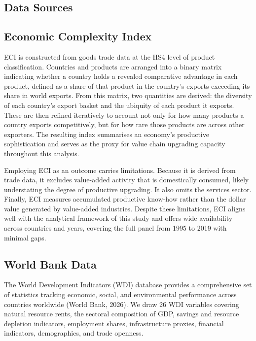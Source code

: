 \documentclass[12pt,a4paper]{report}
\begin{document}
\begin{appendices}

\chapter{Data Sources}

\section{Economic Complexity Index}

ECI is constructed from goods trade data at the HS4 level of product classification. Countries and products are arranged into a binary matrix indicating whether a country holds a revealed comparative advantage in each product, defined as a share of that product in the country's exports exceeding its share in world exports. From this matrix, two quantities are derived: the diversity of each country's export basket and the ubiquity of each product it exports. These are then refined iteratively to account not only for how many products a country exports competitively, but for how rare those products are across other exporters. The resulting index summarises an economy's productive sophistication and serves as the proxy for value chain upgrading capacity throughout this analysis.

Employing ECI as an outcome carries limitations. Because it is derived from trade data, it excludes value-added activity that is domestically consumed, likely understating the degree of productive upgrading. It also omits the services sector. Finally, ECI measures accumulated productive know-how rather than the dollar value generated by value-added industries. Despite these limitations, ECI aligns well with the analytical framework of this study and offers wide availability across countries and years, covering the full panel from 1995 to 2019 with minimal gaps.

\section{World Bank Data}

The World Development Indicators (WDI) database provides a comprehensive set of statistics tracking economic, social, and environmental performance across countries worldwide (World Bank, 2026). We draw 26 WDI variables covering natural resource rents, the sectoral composition of GDP, savings and resource depletion indicators, employment shares, infrastructure proxies, financial indicators, demographics, and trade openness.


\end{appendices}
\end{document}
